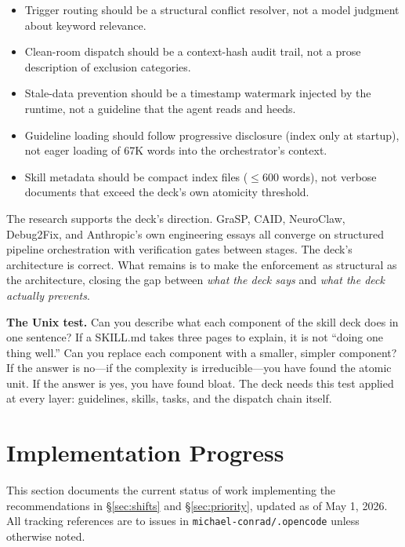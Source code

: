 \documentclass[11pt,a4paper]{article}
\begin{document}
\begin{itemize}[leftmargin=*]
  \item Trigger routing should be a structural conflict resolver, not a model judgment about keyword relevance.
  \item Clean-room dispatch should be a context-hash audit trail, not a prose description of exclusion categories.
  \item Stale-data prevention should be a timestamp watermark injected by the runtime, not a guideline that the agent reads and heeds.
  \item Guideline loading should follow progressive disclosure (index only at startup), not eager loading of 67K words into the orchestrator's context.
  \item Skill metadata should be compact index files ($\leq$600 words), not verbose documents that exceed the deck's own atomicity threshold.
\end{itemize}

The research supports the deck's direction.  GraSP, CAID, NeuroClaw, Debug2Fix, and Anthropic's own engineering essays all converge on structured pipeline orchestration with verification gates between stages.  The deck's architecture is correct.  What remains is to make the enforcement as structural as the architecture, closing the gap between \emph{what the deck says} and \emph{what the deck actually prevents}.

\begin{quotebox}
\textbf{The Unix test.}  Can you describe what each component of the skill deck does in one sentence?  If a SKILL.md takes three pages to explain, it is not ``doing one thing well.''  Can you replace each component with a smaller, simpler component?  If the answer is no---if the complexity is irreducible---you have found the atomic unit.  If the answer is yes, you have found bloat.  The deck needs this test applied at every layer: guidelines, skills, tasks, and the dispatch chain itself.
\end{quotebox}

\newpage

\section{Implementation Progress}
\label{sec:progress}

This section documents the current status of work implementing the recommendations in \S\ref{sec:shifts} and \S\ref{sec:priority}, updated as of May 1, 2026.  All tracking references are to issues in \texttt{michael-conrad/.opencode} unless otherwise noted.
\end{document}
